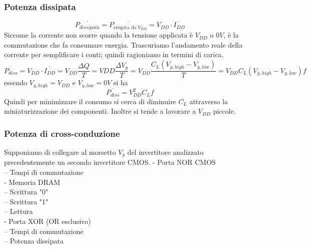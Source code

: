 \documentclass{article}
\begin{document}
\subsubsection*{Potenza dissipata}
\begin{equation*}
\overline{P_{dissipata}} = \overline{P_{\text{erogata da $V_{DD}$}}} = V_{DD} \cdot \overline{I_{DD}}
\end{equation*}
Siccome la corrente non scorre quando la tensione applicata è $V_{DD}$ o $0V$, è la commutazione che fa consumare energia. Trascuriamo l'andamento reale della corrente per semplificare i conti; quindi ragioniamo in termini di carica.
\begin{equation*}
\overline{P_{diss}} = V_{DD} \cdot \overline{I_{DD}} = V_{DD} \frac{\Delta Q}{T} = V{DD} \frac{\Delta V_y}{T} = V_{DD} \frac{C_L (V_{y,high} - V_{y,low})}{T} = V_{DD} C_L (V_{y,high} - V_{y,low})f
\end{equation*}
essendo $V_{y,high} = V_{DD}$ e $V_{y,low} = 0V$ si ha
\begin{equation*}
\overline{P_{diss}} = V_{DD}^2 C_L f
\end{equation*}
Quindi per minimizzare il consumo si cerca di diminuire $C_L$ attraverso la miniaturizzazione dei componenti. Inoltre si tende a lavorare a $V_{DD}$ piccole.

\subsubsection*{Potenza di cross-conduzione}
Supponiamo di collegare al morsetto $V_y$ del invertitore analizzato precedentemente un secondo invertitore CMOS.
- Porta NOR CMOS\\
-- Tempi di commutazione\\
- Memoria DRAM\\
-- Scrittura "0"\\
-- Scrittura "1"\\
-- Lettura\\
- Porta XOR (OR esclusivo)\\
-- Tempi di commutazione\\
-- Potenza dissipata\\

\newpage
\end{document}
